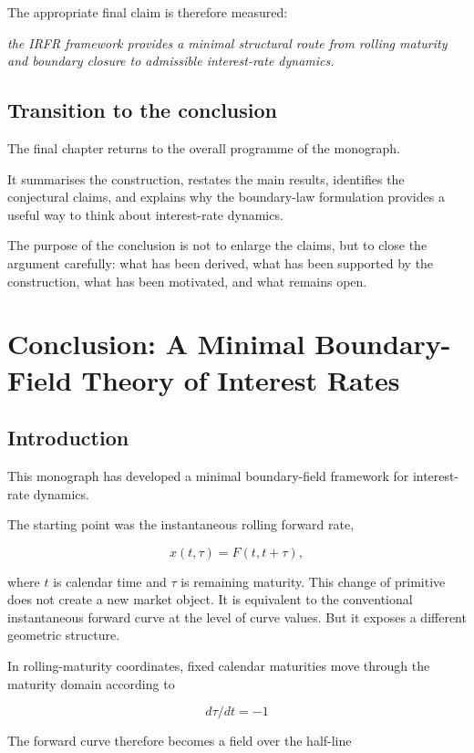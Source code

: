 \documentclass[11pt,oneside]{book}
\begin{document}
The appropriate final claim is therefore measured:

\emph{the IRFR framework provides a minimal structural route from
rolling maturity and boundary closure to admissible interest-rate
dynamics.}

\section{Transition to the
conclusion}\label{transition-to-the-conclusion}

The final chapter returns to the overall programme of the monograph.

It summarises the construction, restates the main results, identifies
the conjectural claims, and explains why the boundary-law formulation
provides a useful way to think about interest-rate dynamics.

The purpose of the conclusion is not to enlarge the claims, but to close
the argument carefully: what has been derived, what has been supported
by the construction, what has been motivated, and what remains open.

\chapter{Conclusion: A Minimal Boundary-Field Theory of Interest Rates}\label{chapter-14}

\section{Introduction}\label{introduction-10}

This monograph has developed a minimal boundary-field framework for
interest-rate dynamics.

The starting point was the instantaneous rolling forward rate,

\[
x(t,\tau)=F(t,t+\tau),
\]

where \(t\) is calendar time and $\tau$ is remaining maturity. This change of
primitive does not create a new market object. It is equivalent to the
conventional instantaneous forward curve at the level of curve values.
But it exposes a different geometric structure.

In rolling-maturity coordinates, fixed calendar maturities move through
the maturity domain according to

\[
d\tau/dt = -1
\]

The forward curve therefore becomes a field over the half-line
\end{document}
